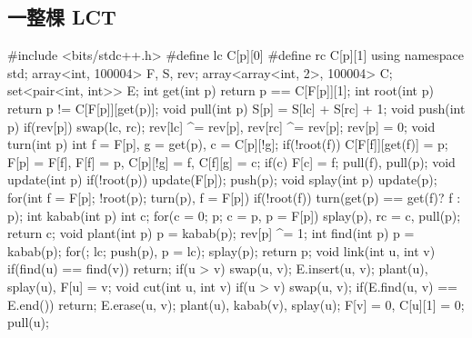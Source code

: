         \subsection{一整棵 LCT}
        \begin{C++}
        #include <bits/stdc++.h>
        #define lc C[p][0]
        #define rc C[p][1]
        using namespace std;
        array<int, 100004> F, S, rev;
        array<array<int, 2>, 100004> C;
        set<pair<int, int>> E;
        int get(int p){
            return p == C[F[p]][1];
        }
        int root(int p){
            return p != C[F[p]][get(p)];
        }
        void pull(int p){
            S[p] = S[lc] + S[rc] + 1;
        }
        void push(int p){
            if(rev[p]) swap(lc, rc);
            rev[lc] ^= rev[p], rev[rc] ^= rev[p];
            rev[p] = 0;
        }
        void turn(int p){
            int f = F[p], g = get(p), c = C[p][!g];
            if(!root(f)) C[F[f]][get(f)] = p;
            F[p] = F[f], F[f] = p, C[p][!g] = f, C[f][g] = c;
            if(c) F[c] = f;
            pull(f), pull(p);
        }
        void update(int p){
            if(!root(p)) update(F[p]);
            push(p);
        }
        void splay(int p){
            update(p);
            for(int f = F[p]; !root(p); turn(p), f = F[p]){
                if(!root(f)) turn(get(p) == get(f)? f : p);
            }
        }
        int kabab(int p){
            int c;
           for(c = 0; p; c = p, p = F[p]){
                splay(p), rc = c, pull(p);
            }
            return c;
        }
        void plant(int p){
            p = kabab(p);
            rev[p] ^= 1;
        }
        int find(int p){
            p = kabab(p);
            for(; lc; push(p), p = lc);
            splay(p);
            return p;
        }
        void link(int u, int v){
            if(find(u) == find(v)) return;
            if(u > v) swap(u, v);
            E.insert({u, v});
            plant(u), splay(u), F[u] = v;
        }
        void cut(int u, int v){
            if(u > v) swap(u, v);
            if(E.find({u, v}) == E.end()) return;
            E.erase({u, v});
            plant(u), kabab(v), splay(u);
            F[v] = 0, C[u][1] = 0;
            pull(u);
        }
        \end{C++}
